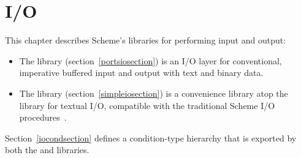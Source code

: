 \chapter{I/O}
\label{iochapter}

This chapter describes Scheme's libraries for performing input and output:

\begin{itemize}
\item The  library
  (section~\ref{portsiosection}) is an I/O layer for conventional,
  imperative buffered input and output with text and binary
  data.
\item The  library
  (section~\ref{simpleiosection}) is a convenience library atop the
   library for textual I/O, compatible with 
  the traditional Scheme I/O procedures~\cite{R5RS}.
\end{itemize}

Section~\ref{iocondsection} defines a condition-type hierarchy that
is exported by both the  and
 libraries.





